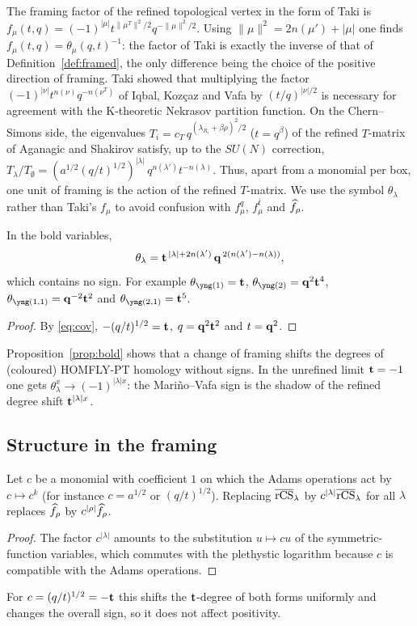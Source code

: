 \begin{remark}\label{rem:Taki}
The framing factor of the refined topological vertex in the form of Taki \cite{Taki07} is
$f_\mu(t,q)=(-1)^{|\mu|}t^{\|\mu^T\|^2/2}q^{-\|\mu\|^2/2}$.
Using $\|\mu\|^2=2n(\mu')+|\mu|$ one finds $f_\mu(t,q)=\theta_\mu(q,t)^{-1}$:
the factor of Taki is exactly the inverse of that of Definition~\ref{def:framed}, the only difference being the choice of the positive direction of framing.
Taki showed that multiplying the factor $(-1)^{|\nu|}t^{n(\nu)}q^{-n(\nu^T)}$ of Iqbal, Koz\c{c}az and Vafa \cite{Iqbal07} by $(t/q)^{|\nu|/2}$ is necessary for agreement with the K-theoretic Nekrasov partition function.
On the Chern--Simons side, the eigenvalues $T_i=c_T\,q^{(\lambda_{R_i}+\beta\rho)^2/2}$ ($t=q^\beta$) of the refined $T$-matrix of Aganagic and Shakirov satisfy,
up to the $SU(N)$ correction, $T_\lambda/T_\emptyset=(a^{1/2}(q/t)^{1/2})^{|\lambda|}\,q^{n(\lambda')}t^{-n(\lambda)}$.
Thus, apart from a monomial per box, one unit of framing is the action of the refined $T$-matrix.
We use the symbol $\theta_\lambda$ rather than Taki's $f_\mu$ to avoid confusion with $f^q_\mu$, $f^{\bar t}_\mu$ and $\widehat{f}_\rho$.
\end{remark}

\begin{proposition}\label{prop:bold}
In the bold variables,
\[
\theta_\lambda=\mathbf{t}^{\,|\lambda|+2n(\lambda')}\,\mathbf{q}^{\,2(n(\lambda')-n(\lambda))},
\]
which contains no sign. For example $\theta_{\yng(1)}=\bt$, $\theta_{\yng(2)}=\bq^2\bt^4$, $\theta_{\yng(1,1)}=\bq^{-2}\bt^2$ and $\theta_{\yng(2,1)}=\bt^5$.
\end{proposition}
\begin{proof}
By \eqref{eq:cov}, $-(q/t)^{1/2}=\mathbf{t}$, $q=\mathbf{q}^2\mathbf{t}^2$ and $t=\mathbf{q}^2$.
\end{proof}
Proposition~\ref{prop:bold} shows that a change of framing shifts the degrees of (coloured) HOMFLY-PT homology without signs.
In the unrefined limit $\mathbf{t}=-1$ one gets $\theta_\lambda^x\to(-1)^{|\lambda|x}$:
the Mari\~no--Vafa sign is the shadow of the refined degree shift $\mathbf{t}^{|\lambda|x}$.

\subsection{Structure in the framing}
\begin{lemma}\label{lem:adams}
Let $c$ be a monomial with coefficient $1$ on which the Adams operations act by $c\mapsto c^k$ (for instance $c=a^{1/2}$ or $(q/t)^{1/2}$).
Replacing $\overline{\mathrm{rCS}}_\lambda$ by $c^{|\lambda|}\overline{\mathrm{rCS}}_\lambda$ for all $\lambda$ replaces $\widehat{f}_\rho$ by $c^{|\rho|}\widehat{f}_\rho$.
\end{lemma}
\begin{proof}
The factor $c^{|\lambda|}$ amounts to the substitution $u\mapsto cu$ of the symmetric-function variables, which commutes with the plethystic logarithm because $c$ is compatible with the Adams operations.
\end{proof}
For $c=(q/t)^{1/2}=-\mathbf{t}$ this shifts the $\mathbf{t}$-degree of both forms uniformly and changes the overall sign, so it does not affect positivity.

